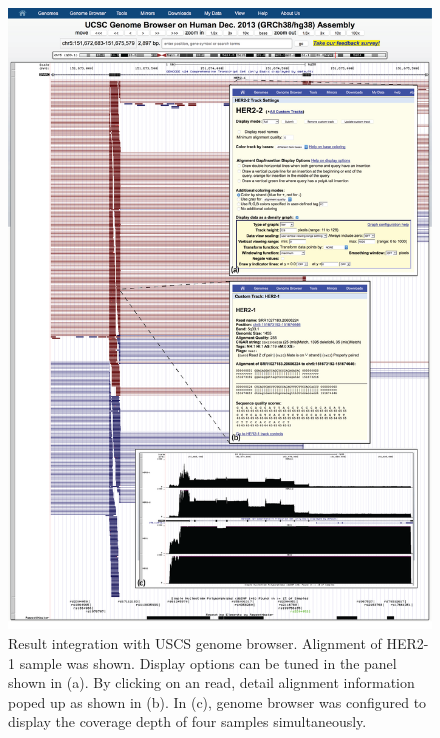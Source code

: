 \begin{figure}[!p]
    \centering
    \includegraphics[width=1\textwidth]{images/result_genome_browser}
    \caption[Result integration with genome browser]{
        Result integration with USCS genome browser. Alignment of HER2-1 sample
        was shown. Display options can be tuned in the panel shown in (a). By
        clicking on an read, detail alignment information poped up as shown in
        (b). In (c), genome browser was configured to display the coverage
        depth of four samples simultaneously.
    }
    \label{fig:result-genome-browser}
\end{figure}


